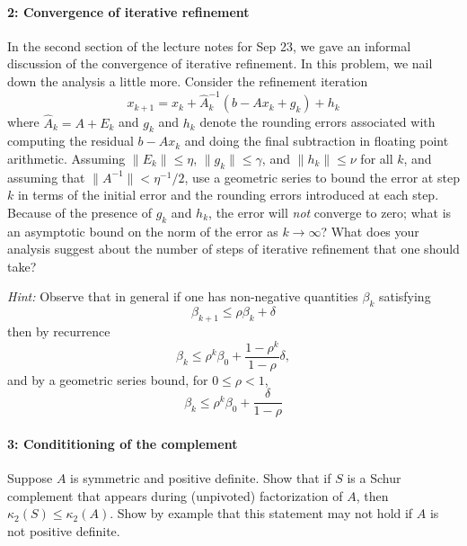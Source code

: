 \documentclass[12pt, leqno]{article} %
\begin{document}
\paragraph*{2: Convergence of iterative refinement}
In the second section of the lecture notes for Sep 23, we gave an
informal discussion of the convergence of iterative refinement.  In
this problem, we nail down the analysis a little more.  Consider the
refinement iteration
\[
  x_{k+1} = x_k + \hat{A}_k^{-1} (b - A x_k + g_k) + h_k
\]
where $\hat{A}_k = A + E_k$ and $g_k$ and $h_k$ denote the rounding
errors associated with computing the residual $b-Ax_k$ and doing the
final subtraction in floating point arithmetic.  Assuming $\|E_k\|
\leq \eta$, $\|g_k\| \leq \gamma$, and $\|h_k\| \leq \nu$ for all $k$,
and assuming that $\|A^{-1}\| < \eta^{-1}/2$, use a geometric series to
bound the error at step $k$ in terms of the initial error and the
rounding errors introduced at each step.  Because of the presence of
$g_k$ and $h_k$, the error will {\em not} converge to zero; what is an
asymptotic bound on the norm of the error as $k \rightarrow \infty$?
What does your analysis suggest about the number of steps of iterative
refinement that one should take?

{\em Hint:}  Observe that in general if one has non-negative
quantities $\beta_k$ satisfying
\[
  \beta_{k+1} \leq \rho \beta_k + \delta
\]
then by recurrence
\[
  \beta_k
  \leq \rho^k \beta_0 + \frac{1-\rho^k}{1-\rho} \delta,
\]
and by a geometric series bound, for $0 \leq \rho < 1$,
\[
  \beta_k \leq \rho^k \beta_0 + \frac{\delta}{1-\rho}
\]

\paragraph*{3: Condititioning of the complement}
Suppose $A$ is symmetric and positive definite.  Show that if $S$ is a
Schur complement that appears during (unpivoted) factorization of $A$, then
$\kappa_2(S) \leq \kappa_2(A)$.  Show by example that this statement
may not hold if $A$ is not positive definite.
\end{document}
